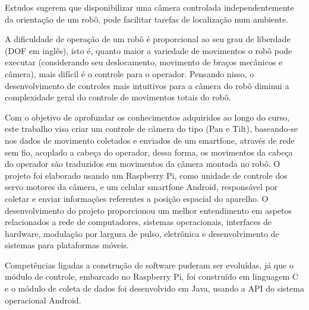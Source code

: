 Estudos sugerem que disponibilizar uma câmera controlada independentemente da orientação de um robô, pode facilitar tarefas de localização num ambiente. 

A dificuldade de operação de um robô é proporcional ao seu grau de liberdade (DOF em inglês), isto é, quanto maior a variedade de movimentos o robô pode executar (considerando seu deslocamento, movimento de braços mecânicos e câmera), mais difícil é o controle para o operador.
Pensando nisso, o desenvolvimento de controles mais intuitivos para a câmera do robô diminui a complexidade geral do controle de movimentos totais do robô. \par

Com o objetivo de aprofundar os conhecimentos adquiridos ao longo do curso, este trabalho visa criar um controle de câmera do tipo (Pan e Tilt), baseando-se nos dados de movimento coletados e enviados de um smartfone, através de rede sem fio, acoplado a cabeça do operador, dessa forma, os movimentos da cabeça do operador são traduzidos em movimentos da câmera montada no robô. O projeto foi elaborado usando um Raspberry Pi, como unidade de controle dos servo motores da câmera, e um celular smartfone Android, responsável por coletar e enviar informações referentes a posição espacial do aparelho. O desenvolvimento do projeto proporcionou um melhor entendimento em aspetos relacionados a rede de computadores, sistemas operacionais, interfaces de hardware, modulação por largura de pulso, eletrônica e desenvolvimento de sistemas para plataformas móveis.\par

Competências ligadas a construção de software puderam ser evoluídas, já que o módulo de controle, embarcado no Raspberry Pi, foi construído em linguagem C e o módulo de coleta de dados foi desenvolvido em Java, usando a API do sistema operacional Android.

